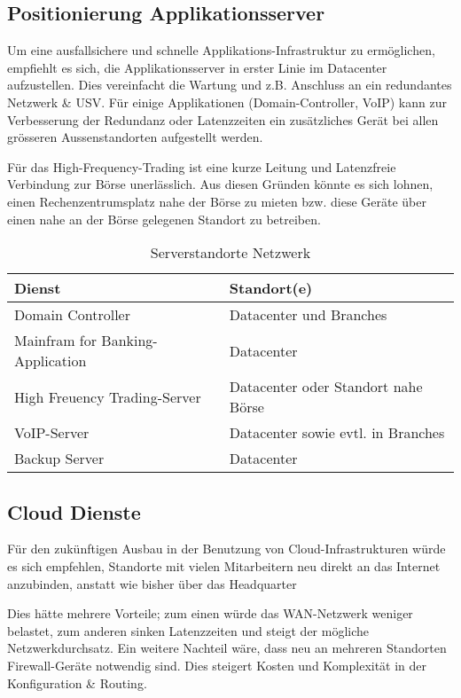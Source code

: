 \subsection{Positionierung Applikationsserver}

Um eine ausfallsichere und schnelle Applikations-Infrastruktur zu ermöglichen, empfiehlt es sich, die Applikationsserver in erster Linie im Datacenter aufzustellen. Dies vereinfacht die Wartung und z.B. Anschluss an ein redundantes Netzwerk \& USV. Für einige Applikationen (Domain-Controller, VoIP) kann zur Verbesserung der Redundanz oder Latenzzeiten ein zusätzliches Gerät bei allen grösseren Aussenstandorten aufgestellt werden.

Für das High-Frequency-Trading ist eine kurze Leitung und Latenzfreie Verbindung zur Börse unerlässlich. Aus diesen Gründen könnte es sich lohnen, einen Rechenzentrumsplatz nahe der Börse zu mieten bzw. diese Geräte über einen nahe an der Börse gelegenen Standort zu betreiben.

\begin{table}[h]
	\centering
	\begin{tabu} to \linewidth {l l}
		\toprule 
		Dienst & Standort(e) \\
		\midrule
		Domain Controller & Datacenter und Branches \\
		Mainfram for Banking-Application & Datacenter \\
		High Freuency Trading-Server & Datacenter oder Standort nahe Börse \\
		VoIP-Server & Datacenter sowie evtl. in Branches\\
		Backup Server & Datacenter \\
		\bottomrule 
	\end{tabu} 
	\label{tbl:server_standorte}
	\caption{Serverstandorte Netzwerk}
\end{table}

\subsection{Cloud Dienste}

Für den zukünftigen Ausbau in der Benutzung von Cloud-Infrastrukturen würde es sich empfehlen, Standorte mit vielen Mitarbeitern neu direkt an das Internet anzubinden, anstatt wie bisher über das Headquarter

Dies hätte mehrere Vorteile; zum einen würde das WAN-Netzwerk weniger belastet, zum anderen sinken Latenzzeiten und steigt der mögliche Netzwerkdurchsatz. Ein weitere Nachteil wäre, dass neu an mehreren Standorten Firewall-Geräte notwendig sind. Dies steigert Kosten und Komplexität in der Konfiguration \& Routing.



